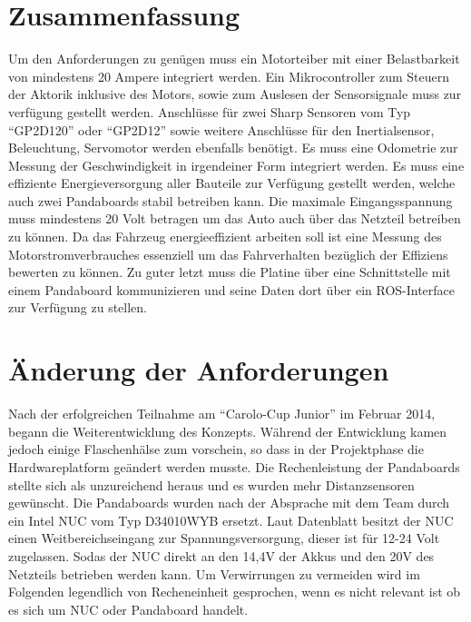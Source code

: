 \section{Zusammenfassung}
Um den Anforderungen zu genügen muss ein Motorteiber mit einer Belastbarkeit von mindestens 20 Ampere integriert werden. 
Ein Mikrocontroller zum Steuern der Aktorik inklusive des Motors, sowie zum Auslesen der Sensorsignale muss zur verfügung gestellt werden. 
Anschlüsse für zwei Sharp Sensoren vom Typ ``GP2D120'' oder ``GP2D12'' sowie weitere Anschlüsse für den Inertialsensor, Beleuchtung, Servomotor werden ebenfalls benötigt. 
Es muss eine Odometrie zur Messung der Geschwindigkeit in irgendeiner Form integriert werden.
Es muss eine effiziente Energieversorgung aller Bauteile zur Verfügung gestellt werden, welche auch zwei Pandaboards stabil betreiben kann. Die maximale Eingangsspannung
muss mindestens 20 Volt betragen um das Auto auch über das Netzteil betreiben zu können.
Da das Fahrzeug energieeffizient arbeiten soll ist eine Messung des Motorstromverbrauches essenziell um das Fahrverhalten bezüglich der Effiziens bewerten zu können.
Zu guter letzt muss die Platine über eine Schnittstelle mit einem Pandaboard kommunizieren und seine Daten dort über ein ROS-Interface zur Verfügung zu stellen.

\section{Änderung der Anforderungen}
Nach der erfolgreichen Teilnahme am ``Carolo-Cup Junior'' im Februar 2014, begann die Weiterentwicklung des Konzepts. Während der Entwicklung kamen jedoch
einige Flaschenhälse zum vorschein, so dass in der Projektphase die Hardwareplatform geändert werden musste. Die Rechenleistung der Pandaboards stellte sich
als unzureichend heraus und es wurden mehr Distanzsensoren gewünscht. Die Pandaboards wurden nach der Absprache mit dem Team durch ein Intel NUC vom Typ
D34010WYB ersetzt. Laut Datenblatt \cite{datasheet-nuc} besitzt der NUC einen Weitbereichseingang zur Spannungsversorgung, dieser ist für 12-24 Volt zugelassen.
Sodas der NUC direkt an den 14,4V der Akkus und den 20V des Netzteils betrieben werden kann.  Um Verwirrungen zu vermeiden wird im Folgenden legendlich 
von Recheneinheit gesprochen, wenn es nicht relevant ist ob es sich um NUC oder Pandaboard handelt.
